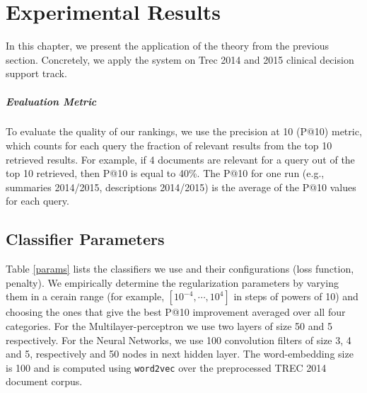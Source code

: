 \chapter{Experimental Results}

In this chapter, we present the application of the theory from the previous section. Concretely, we apply the system on Trec 2014 and 2015
clinical decision support track.

\paragraph{Evaluation Metric}
To evaluate the quality of our rankings, we use the precision at 10 (P@10) metric, which counts for each query the fraction of
relevant results from the top 10 retrieved results. For example, if 4 documents are relevant for a query out of the top 10 retrieved,
then P@10 is equal to 40\%. The P@10 for one run (e.g., summaries 2014/2015, descriptions 2014/2015) is the average of
the P@10 values for each query.

\section{Classifier Parameters}
Table \ref{params} lists the classifiers we use and their configurations (loss function, penalty). We empirically determine
the regularization
parameters by varying them in a cerain range (for example, $[10^{-4},\cdots,10^4]$ in steps of powers of 10) and choosing the ones
that give the
best P@10 improvement averaged over all four categories.
For the Multilayer-perceptron we use two layers of size 50 and 5 respectively. For the Neural Networks,
we use 100 convolution filters of size 3, 4 and 5, respectively and 50 nodes in next hidden layer. The word-embedding size is 100 
and is computed using \texttt{word2vec} over the preprocessed TREC 2014 document corpus.


